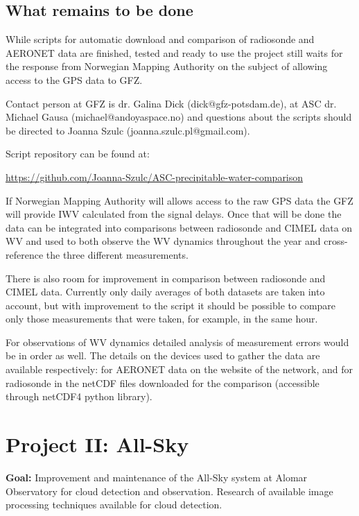\documentclass[]{book}
\begin{document}
	\section{What remains to be done}
	
	While scripts for automatic download and comparison of radiosonde and AERONET data are finished, tested and ready to use the project still waits for the response from Norwegian Mapping Authority on the subject of allowing access to the GPS data to GFZ. 
	
	Contact person at GFZ is dr. Galina Dick (dick@gfz-potsdam.de), at ASC dr. Michael Gausa (michael@andoyaspace.no) and questions about the scripts should be directed to Joanna Szulc (joanna.szulc.pl@gmail.com).
	
	Script repository can be found at:
	
	\url{https://github.com/Joanna-Szulc/ASC-precipitable-water-comparison}
	
	If Norwegian Mapping Authority will allows access to the raw GPS data the GFZ will provide IWV calculated from the signal delays. Once that will be done the data can be integrated into comparisons between radiosonde and CIMEL data on WV and used to both observe the WV dynamics throughout the year and cross-reference the three different measurements.
	
	There is also room for improvement in comparison between radiosonde and CIMEL data. Currently only daily averages of both datasets are taken into account, but with improvement to the script it should be possible to compare only those measurements that were taken, for example, in the same hour.
	
	For observations of WV dynamics detailed analysis of measurement errors would be in order as well. The details on the devices used to gather the data are available respectively: for AERONET data on the website of the network, and for radiosonde in the netCDF files downloaded for the comparison (accessible through netCDF4 python library).
	
	\pagebreak

\chapter{Project II: All-Sky}

	\textbf{Goal:} Improvement and maintenance of the All-Sky system at Alomar Observatory for cloud detection and observation. Research of available image processing techniques available for cloud detection.
	
\end{document}
